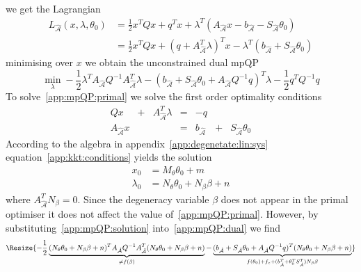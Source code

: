 %
we get the Lagrangian
%
\begin{equation}\begin{split}
	L_{\hat{\mathcal A}}(x,\lambda,\theta_0)  &= \frac{1}{2} x^T Q x +q^Tx + \lambda^T\left(A_{\hat{\mathcal A}}x - 
	b_{\hat{\mathcal A}} - S_{\hat{\mathcal A}}\theta_0\right)\\
	&=\frac{1}{2} x^T Q x + \left(q + A_{\hat{\mathcal A}}^T\lambda\right)^Tx 
	-\lambda^T \left(b_{\hat{\mathcal A}} + S_{\hat{\mathcal A}}\theta_0\right)
\end{split}\end{equation}
%
minimising over $x$ we obtain the unconstrained dual mpQP
%
\begin{equation}\label{app:mpQP:dual}
	\min_\lambda -\frac{1}{2}\lambda^T A_{\hat{\mathcal A}} Q^{-1}A_{\hat{\mathcal A}}^T \lambda 
	-(b_{\hat{\mathcal A}} + S_{\hat{\mathcal A}}\theta_0 + A_{\hat{\mathcal A}} Q^{-1}q)^T\lambda
	-\frac{1}{2}q^TQ^{-1}q
\end{equation}
%
To solve~\eqref{app:mpQP:primal} we solve the first order optimality conditions
%
\begin{equation}\label{app:kkt:conditions}
	\begin{array}{ccccccc}
		Q x &+& A^T_{\hat{\mathcal A}}\lambda & = & -q && \\
		A_{\hat{\mathcal A}} x & & & = & b_{\hat{\mathcal A}}& +& S_{\hat{\mathcal A}}\theta_0
	\end{array}
\end{equation}
%
According to the algebra in appendix~\ref{app:degenetate:lin:sys} equation~\eqref{app:kkt:conditions} yields
the solution
%
\begin{equation}\label{app:mpQP:solution}
	\begin{split}
	x_0 &= M_\theta \theta_0 + m\\
	\lambda_0 &= N_\theta \theta_0 + N_\beta \beta + n
	\end{split}
\end{equation}
%
where $A^T_{\hat{\mathcal A}} N_\beta=0$. Since the degeneracy variable $\beta$ does not appear in the
primal optimiser it does not affect the value of~\eqref{app:mpQP:primal}.
%
However, by substituting~\eqref{app:mpQP:solution} into~\eqref{app:mpQP:dual}
we find
%
\begin{equation}\Resize{
	-\frac{1}{2}\underbrace{(N_\theta \theta_0 + N_\beta \beta + n)^T A_{\hat{\mathcal A}} Q^{-1}A^T_{\hat{\mathcal A}} 
	(N_\theta \theta_0 + N_\beta \beta + n)}_{\neq f(\beta)} -\underbrace{( 
	b_{\hat{\mathcal A}} + S_{\hat{\mathcal A}}\theta_0 + A_{\hat{\mathcal A}} Q^{-1} q)^T(N_\theta \theta_0 + N_\beta \beta + 
	n)}_{f(\theta_0)+f_c + (b^T_{\hat{\mathcal A}}+\theta^T_0S^T_{\hat{\mathcal A}})N_\beta 
	\beta}
	}
\end{equation}
